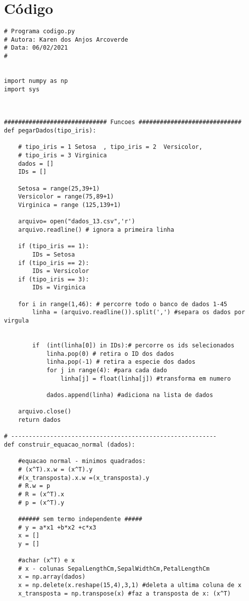 \documentclass[a4paper,12pt,twoside]{article}
\begin{document}
\section{Código}
\begin{lstlisting}
# Programa codigo.py
# Autora: Karen dos Anjos Arcoverde
# Data: 06/02/2021
#


import numpy as np
import sys



############################# Funcoes #############################
def pegarDados(tipo_iris): 
    
    # tipo_iris = 1 Setosa  , tipo_iris = 2  Versicolor, 
    # tipo_iris = 3 Virginica
    dados = []
    IDs = []
    
    Setosa = range(25,39+1)
    Versicolor = range(75,89+1)
    Virginica = range (125,139+1)
    
    arquivo= open("dados_13.csv",'r')
    arquivo.readline() # ignora a primeira linha
    
    if (tipo_iris == 1):
        IDs = Setosa
    if (tipo_iris == 2):
        IDs = Versicolor
    if (tipo_iris == 3):
        IDs = Virginica
        
    for i in range(1,46): # percorre todo o banco de dados 1-45
        linha = (arquivo.readline()).split(',') #separa os dados por virgula
    
        
        if  (int(linha[0]) in IDs):# percorre os ids selecionados
            linha.pop(0) # retira o ID dos dados
            linha.pop(-1) # retira a especie dos dados
            for j in range(4): #para cada dado 
                linha[j] = float(linha[j]) #transforma em numero
                
            dados.append(linha) #adiciona na lista de dados
            
    arquivo.close()
    return dados

# ----------------------------------------------------------
def construir_equacao_normal (dados):
    
    #equacao normal - minimos quadrados:
    # (x^T).x.w = (x^T).y
    #(x_transposta).x.w =(x_transposta).y
    # R.w = p
    # R = (x^T).x
    # p = (x^T).y
    
    ###### sem termo independente #####
    # y = a*x1 +b*x2 +c*x3
    x = []
    y = []
    
    #achar (x^T) e x
    # x - colunas SepalLengthCm,SepalWidthCm,PetalLengthCm
    x = np.array(dados) 
    x = np.delete(x.reshape(15,4),3,1) #deleta a ultima coluna de x
    x_transposta = np.transpose(x) #faz a transposta de x: (x^T)
    

\end{lstlisting}
\end{document}
